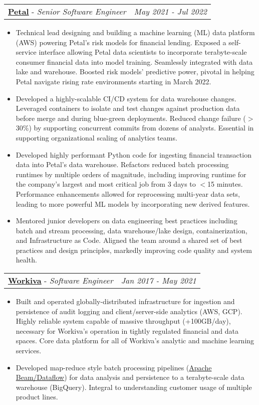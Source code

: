 \documentclass[letterpaper,11pt]{article}
\makeatletter
\newcommand{\resumeItemLean}[1]{
  \item\small{#1}
}
\newcommand{\resumeSubheadingSmall}[3]{
  \vspace{-1pt}\item[]
    \begin{tabular*}{0.97\textwidth}{l@{\extracolsep{\fill}}r}
      \textbf{#1} - \textit{\small #2} & \textit{\small #3}
    \end{tabular*}\vspace{-5pt}
}
\newcommand{\resumeItemListStart}{\begin{itemize}}
\newcommand{\resumeItemListEnd}{\end{itemize}\vspace{-5pt}}
\makeatother
\begin{document}
    \resumeSubheadingSmall
      {\href{https://www.petalcard.com/}{Petal}}{Senior Software Engineer}{May 2021 - Jul 2022}
      \resumeItemListStart
        \resumeItemLean{Technical lead designing and building a machine learning (ML) data platform (AWS) powering Petal's risk models for financial lending. Exposed a self-service interface allowing Petal data scientists to incorporate terabyte-scale consumer financial data into model training. Seamlessly integrated with data lake and warehouse. Boosted risk models' predictive power, pivotal in helping Petal navigate rising rate environments starting in March 2022.}
        \resumeItemLean{Developed a highly-scalable CI/CD system for data warehouse changes. Leveraged containers to isolate and test changes against production data before merge and during blue-green deployments. Reduced change failure ($>$30\%) by supporting concurrent commits from dozens of analysts. Essential in supporting organizational scaling of analytics teams.}
        \resumeItemLean{Developed highly performant Python code for ingesting financial transaction data into Petal's data warehouse. Refactors reduced batch processing runtimes by multiple orders of magnitude, including improving runtime for the company's largest and most critical job from 3 days to $<$15 minutes. Performance enhancements allowed for reprocessing multi-year data sets, leading to more powerful ML models by incorporating new derived features.}
        \resumeItemLean{Mentored junior developers on data engineering best practices including batch and stream processing, data warehouse/lake design, containerization, and Infrastructure as Code. Aligned the team around a shared set of best practices and design principles, markedly improving code quality and system health.}
      \resumeItemListEnd

    \resumeSubheadingSmall
      {\href{https://www.workiva.com/}{Workiva}}{Software Engineer}{Jan 2017 - May 2021}
      \resumeItemListStart
        \resumeItemLean{Built and operated globally-distributed infrastructure for ingestion and persistence of audit logging and client/server-side analytics (AWS, GCP). Highly reliable system capable of massive throughput (+100GB/day), necessary for Workiva's operation in tightly regulated financial and data spaces. Core data platform for all of Workiva's analytic and machine learning services.}
        \resumeItemLean{Developed map-reduce style batch processing pipelines (\href{https://beam.apache.org/}{Apache Beam/Dataflow}) for data analysis and persistence to a terabyte-scale data warehouse (BigQuery). Integral to understanding customer usage of multiple product lines.} 
      \resumeItemListEnd
\end{document}
